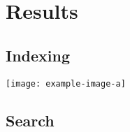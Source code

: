 
\chapter{Results}

\section{Indexing}
\texttt{[image: example-image-a]}

\section{Search}

\clearpage